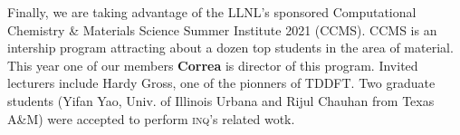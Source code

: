 Finally, we are taking advantage of the LLNL's sponsored Computational Chemistry \& Materials Science Summer Institute 2021 (CCMS).
CCMS is an intership program attracting about a dozen top students in the area of material.
This year one of our members {\bf Correa} is director of this program.
Invited lecturers include Hardy Gross, one of the pionners of TDDFT.
Two graduate students (Yifan Yao, Univ. of Illinois Urbana and Rijul Chauhan from Texas A\&M) were accepted to perform \textsc{inq}'s related wotk.

\clearpage

